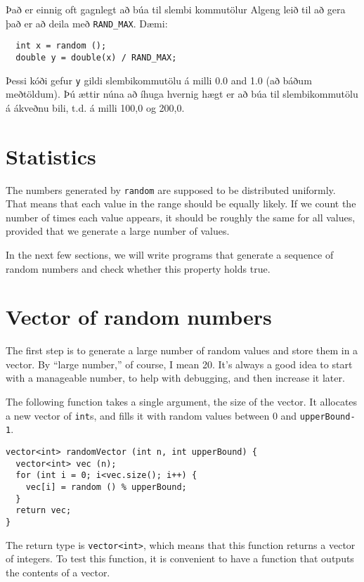 Það er einnig oft gagnlegt að búa til slembi kommutölur
Algeng leið til að gera það er að deila með {\tt RAND\_MAX}.
Dæmi:

\begin{verbatim}
  int x = random ();
  double y = double(x) / RAND_MAX;
\end{verbatim}
%
Þessi kóði gefur {\tt y} gildi slembikommutölu á milli 0.0 and 1.0 (að báðum meðtöldum).
Þú ættir núna að íhuga hvernig hægt er að búa til slembikommutölu á ákveðnu bili, t.d. á milli 100,0 og 200,0.

\section{Statistics}

The numbers generated by {\tt random} are supposed to be distributed
uniformly.  That means that each value in the range should be
equally likely.  If we count the number of times each value appears,
it should be roughly the same for all values, provided that we
generate a large number of values.

In the next few sections, we will write programs that generate
a sequence of random numbers and check whether this property
holds true.

\section{Vector of random numbers}

The first step is to generate a large number of random values
and store them in a vector.  By ``large number,'' of course,
I mean 20.  It's always a good idea to start with a manageable
number, to help with debugging, and then increase it later.

The following function takes a single argument, the size of
the vector.  It allocates a new vector of {\tt int}s, 
and fills it with random values between 0 and {\tt upperBound-1}.

\begin{verbatim}
vector<int> randomVector (int n, int upperBound) {
  vector<int> vec (n);
  for (int i = 0; i<vec.size(); i++) {
    vec[i] = random () % upperBound;
  }
  return vec;
}
\end{verbatim}
%
The return type is {\tt vector<int>}, which means that
this function returns a vector of integers.
To test this function, it is convenient to have a function that
outputs the contents of a vector.

